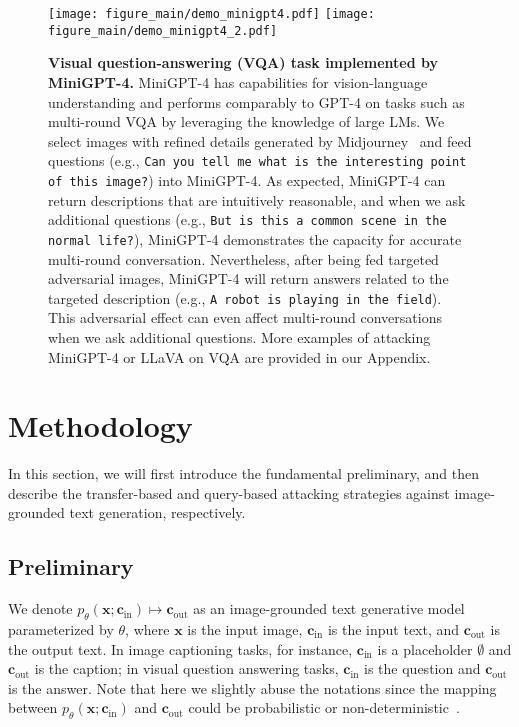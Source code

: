 \begin{figure*}[t]
\vspace{-0.cm}
    \centering
    \texttt{[image: figure\_main/demo\_minigpt4.pdf]}
    \vspace{3mm}
    \texttt{[image: figure\_main/demo\_minigpt4\_2.pdf]}
    \vspace{-0.7cm}
    \caption{
    \textbf{Visual question-answering (VQA) task implemented by MiniGPT-4.} MiniGPT-4 has capabilities for vision-language understanding and performs comparably to GPT-4 on tasks such as multi-round VQA by leveraging the knowledge of large LMs. We select images with refined details generated by Midjourney~\citep{Midjourney} and feed questions (e.g., \texttt{Can you tell me what is the interesting point of this image?}) into MiniGPT-4. 
    As expected, MiniGPT-4 can return descriptions that are intuitively reasonable, and when we ask additional questions (e.g., \texttt{But is this a common scene in the normal life?}), MiniGPT-4 demonstrates the capacity for accurate multi-round conversation. Nevertheless, after being fed targeted adversarial images, MiniGPT-4 will return answers related to the targeted description (e.g., \texttt{A robot is playing in the field}). This adversarial effect can even affect multi-round conversations when we ask additional questions. More examples of attacking MiniGPT-4 or LLaVA on VQA are provided in our Appendix.
    }
    \label{fig:demo-minigpt4}
    \vspace{-0.05cm}
\end{figure*}

\section{Methodology}
In this section, we will first introduce the fundamental preliminary, and then describe the transfer-based and query-based attacking strategies against image-grounded text generation, respectively.

\subsection{Preliminary}
We denote $p_{\theta}(\boldsymbol{x};\boldsymbol{c}_{\text{in}})\mapsto \boldsymbol{c}_{\text{out}}$ as an image-grounded text generative model parameterized by $\theta$, where $\boldsymbol{x}$ is the input image, $\boldsymbol{c}_{\text{in}}$ is the input text, and $\boldsymbol{c}_{\text{out}}$ is the output text. In image captioning tasks, for instance, $\boldsymbol{c}_{\text{in}}$ is a placeholder $\emptyset$ and $\boldsymbol{c}_{\text{out}}$ is the caption; in visual question answering tasks, $\boldsymbol{c}_{\text{in}}$ is the question and $\boldsymbol{c}_{\text{out}}$ is the answer. Note that here we slightly abuse the notations since the mapping between $p_{\theta}(\boldsymbol{x};\boldsymbol{c}_{\text{in}})$ and $\boldsymbol{c}_{\text{out}}$ could be probabilistic or non-deterministic~\citep{bao2022one,xu2022versatile}.

